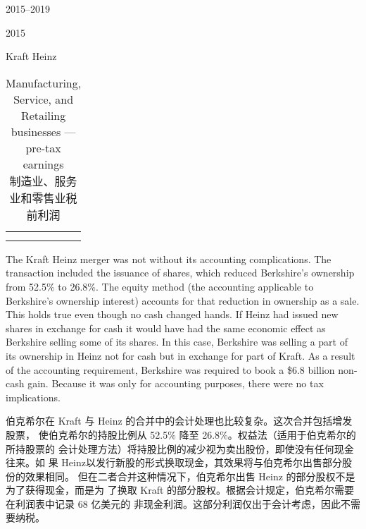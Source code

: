 \begin{chapter}{2015--2019}
\begin{section}{2015}
\begin{subsection}{Kraft Heinz}
\begin{table}[!htbp]
\begin{center}
\begin{tabular}{cccccc}
      \midrule
       \\
       \\
      \bottomrule
    \end{tabular}
    \caption{Manufacturing, Service, and Retailing businesses --- pre-tax
      earnings \\ 制造业、服务业和零售业税前利润}
  \end{center}
\end{table}


\begin{verseparallel}
  {

    The Kraft Heinz merger was not without its accounting complications. The
    transaction included the issuance of shares, which reduced Berkshire’s
    ownership from 52.5\% to 26.8\%. The equity method (the accounting
    applicable to Berkshire’s ownership interest) accounts for that reduction
    in ownership as a sale. This holds true even though no cash changed hands.
    If Heinz had issued new shares in exchange for cash it would have had the
    same economic effect as Berkshire selling some of its shares. In this case,
    Berkshire was selling a part of its ownership in Heinz not for cash but in
    exchange for part of Kraft. As a result of the accounting requirement,
    Berkshire was required to book a \$6.8 billion non-cash gain. Because it was
    only for accounting purposes, there were no tax implications.
  }
  {
    伯克希尔在 Kraft 与 Heinz 的合并中的会计处理也比较复杂。这次合并包括增发股票，
    使伯克希尔的持股比例从 52.5\% 降至 26.8\%。权益法（适用于伯克希尔的所持股票的
    会计处理方法）将持股比例的减少视为卖出股份，即使没有任何现金往来。如
    果 Heinz以发行新股的形式换取现金，其效果将与伯克希尔出售部分股份的效果相同。
    但在二者合并这种情况下，伯克希尔出售 Heinz 的部分股权不是为了获得现金，而是为
    了换取 Kraft 的部分股权。根据会计规定，伯克希尔需要在利润表中记录 68 亿美元的
    非现金利润。这部分利润仅出于会计考虑，因此不需要纳税。
  } 

\end{verseparallel}

\end{subsection}


\end{section}
\end{chapter}
